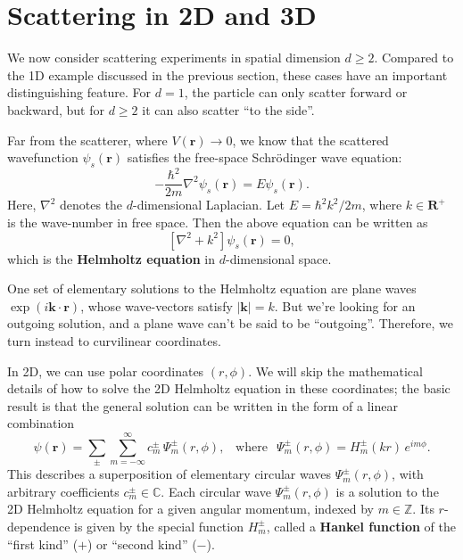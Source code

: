 \documentclass[pra,12pt]{revtex4}
\begin{document}
\section{Scattering in 2D and 3D}
\label{sec:2d3d_scattering}

We now consider scattering experiments in spatial dimension $d \ge 2$.
Compared to the 1D example discussed in the previous section, these
cases have an important distinguishing feature.  For $d = 1$, the
particle can only scatter forward or backward, but for $d \ge 2$ it
can also scatter ``to the side''.

Far from the scatterer, where $V(\mathbf{r})\rightarrow 0$, we know
that the scattered wavefunction $\psi_s(\mathbf{r})$ satisfies the
free-space Schr\"odinger wave equation:
\begin{equation}
  -\frac{\hbar^2}{2m} \nabla^2 \psi_s(\mathbf{r}) = E \psi_s(\mathbf{r}).
\end{equation}
Here, $\nabla^2$ denotes the $d$-dimensional Laplacian.  Let $E =
\hbar^2 k^2 / 2m$, where $k \in \mathbf{R}^+$ is the wave-number in
free space.  Then the above equation can be written as
\begin{equation}
  \left[\nabla^2 + k^2\right] \psi_s(\mathbf{r}) = 0,
\end{equation}
which is the \textbf{Helmholtz equation} in $d$-dimensional space.

One set of elementary solutions to the Helmholtz equation are plane
waves $\exp(i\mathbf{k}\cdot\mathbf{r})$, whose wave-vectors satisfy
$|\mathbf{k}| = k$.  But we're looking for an outgoing solution, and
a plane wave can't be said to be ``outgoing''.  Therefore, we turn
instead to curvilinear coordinates.

In 2D, we can use polar coordinates $(r,\phi)$.  We will skip the
mathematical details of how to solve the 2D Helmholtz equation in
these coordinates; the basic result is that the general solution can
be written in the form of a linear combination
\begin{equation}
  \psi(\mathbf{r})=\sum_{\pm}\sum_{m=-\infty}^\infty c_m^\pm\,\Psi_m^\pm(r,\phi), \;\;\;\mathrm{where}\;\;\,\Psi_m^\pm(r,\phi) = H_m^\pm(kr)\,e^{im\phi}.
\end{equation}
This describes a superposition of elementary circular waves
$\Psi_m^\pm(r,\phi)$, with arbitrary coefficients $c_m^\pm \in
\mathbb{C}$.  Each circular wave $\Psi_m^\pm(r,\phi)$ is a solution to
the 2D Helmholtz equation for a given angular momentum, indexed by $m
\in \mathbb{Z}$.  Its $r$-dependence is given by the special function
$H_m^\pm$, called a \textbf{Hankel function} of the ``first kind''
($+$) or ``second kind'' ($-$).
\end{document}
